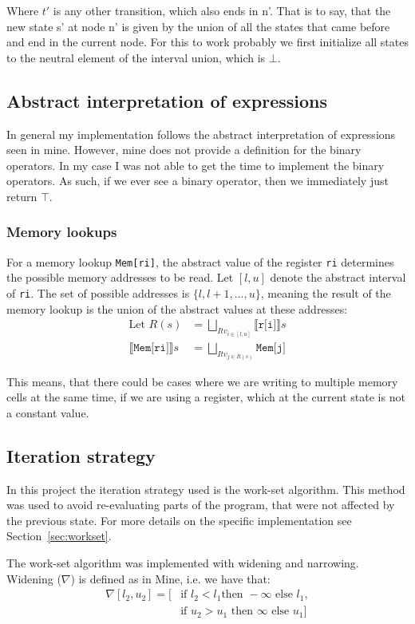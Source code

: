 Where $t'$ is any other transition, which also ends in n'. That is to say, that
the new state s' at node n' is given by the union of all the states that came
before and end in the current node. For this to work probably we first
initialize all states to the neutral element of the interval union, which is
$\bot$.


\subsection*{Abstract interpretation of expressions}
In general my implementation follows the abstract interpretation of expressions
seen in mine\cite{mine}. However, mine does not provide a definition for the
binary operators. In my case I was not able to get the time to implement the
binary operators. As such, if we ever see a binary operator, then we
immediately just return $\top$.

\subsubsection*{Memory lookups}
For a memory lookup \texttt{Mem[ri]}, the abstract value of the register
\texttt{ri} determines the possible memory addresses to be read. Let $[l, u]$
denote the abstract interval of \texttt{ri}. The set of possible addresses is
$\{l, l+1, \dots, u\}$, meaning the result of the memory lookup is the union of
the abstract values at these addresses:
\begin{align}
  \text{Let } R(s)&= \bigsqcup_{Itv_{i \in [l, u]}} \llbracket \texttt{r[i]} \rrbracket s \\
  \llbracket \texttt{Mem[ri]} \rrbracket s &= \bigsqcup_{Itv_{j \in R(s)}} \texttt{Mem[j]}
\end{align}

This means, that there could be cases where we are writing to multiple memory
cells at the same time, if we are using a register, which at the current state
is not a constant value.


\subsection*{Iteration strategy}
In this project the iteration strategy used is the work-set algorithm. This
method was used to avoid re-evaluating parts of the program, that were not
affected by the previous state. For more details on the specific implementation
see Section~\ref{sec:workset}.

The work-set algorithm was implemented with widening and narrowing. Widening
($\nabla$) is defined as in Mine\cite{mine}, i.e. we have that: 
\begin{align*}
  [l_1, u_1] \nabla [l_2, u_2] = [&\text{if } l_2 < l_1 \text{
  then } - \infty \text{ else } l_1, \\ 
  &\text{if } u_2 > u_1 \text{ then }
  \infty \text{ else } u_1]
\end{align*}

